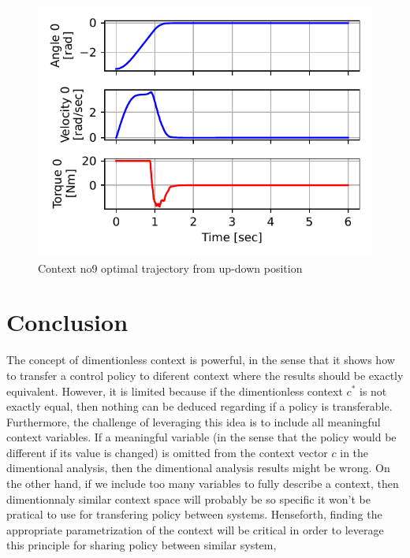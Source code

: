 \begin{figure}[p]
\begin{center}
\includegraphics[width=0.99\linewidth]{fig/c9_traj.pdf}
\caption{Context no9 optimal trajectory from up-down position}\label{fig:c9_traj}
\end{center}
\end{figure}



\section{Conclusion}


The concept of dimentionless context is powerful, in the sense that it shows how to transfer a control policy to diferent context where the results should be exactly equivalent. However, it is limited because if the dimentionless context $c^*$ is not exactly equal, then nothing can be deduced regarding if a policy is transferable. Furthermore, the challenge of leveraging this idea is to include all meaningful context variables. If a meaningful variable (in the sense that the policy would be different if its value is changed) is omitted from the context vector $c$ in the dimentional analysis, then the dimentional analysis results might be wrong. On the other hand, if we include too many variables to fully describe a context, then dimentionnaly similar context space will probably be so specific it won't be pratical to use for transfering policy between systems. Henseforth, finding the appropriate parametrization of the context will be critical in order to leverage this principle for sharing policy between similar system, 
